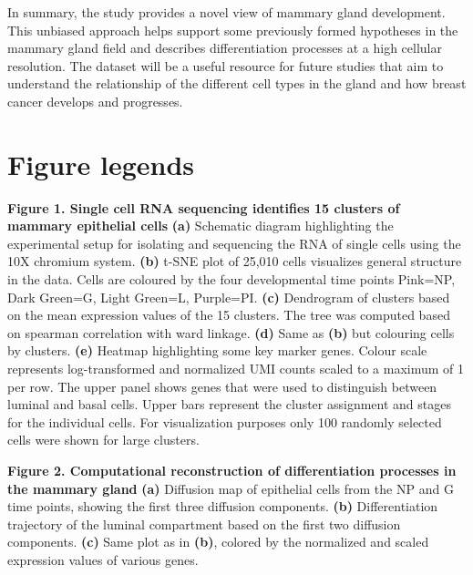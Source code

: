 \documentclass[titlepage, 12pt, oneside]{amsart}
\newcommand{\fakefigure}[1]%
{\refstepcounter{figure}\label{#1}}
\begin{document}
In summary, the study provides a novel view of mammary gland development.
This unbiased approach helps support some previously formed hypotheses in the mammary gland field and describes differentiation processes at a high cellular resolution.
The dataset will be a useful resource for future studies that aim to understand the relationship of the different cell types in the gland and how breast cancer develops and progresses.

\section{Figure legends}

\textbf{Figure 1. Single cell RNA sequencing identifies 15 clusters of mammary epithelial cells }
\fakefigure{F1}
\textbf{(a)} Schematic diagram highlighting the experimental setup for isolating and sequencing the RNA of single cells using the 10X chromium system.
\textbf{(b)} t-SNE plot of 25,010 cells visualizes general structure in the data.
Cells are coloured by the four developmental time points Pink=NP, Dark Green=G, Light Green=L, Purple=PI.
\textbf{(c)} Dendrogram of clusters based on the mean expression values of the 15 clusters. The tree was computed based on spearman correlation with ward linkage.
\textbf{(d)} Same as \textbf{(b)} but colouring cells by clusters.
\textbf{(e)} Heatmap highlighting some key marker genes.
Colour scale represents log-transformed and normalized UMI counts scaled to a maximum of 1 per row.
The upper panel shows genes that were used to distinguish between luminal and basal cells.
Upper bars represent the cluster assignment and stages for the individual cells.
For visualization purposes only 100 randomly selected cells were shown for large clusters.


\textbf{Figure 2. Computational reconstruction of differentiation processes in the mammary gland}
\fakefigure{F2}
\textbf{(a)} Diffusion map of epithelial cells from the NP and G time points, showing the first three diffusion components.
\textbf{(b)} Differentiation trajectory of the luminal compartment based on the first two diffusion components.
\textbf{(c)} Same plot as in \textbf{(b)}, colored by the normalized and scaled expression values of various genes.
\end{document}
